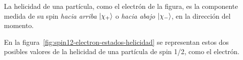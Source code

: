 La helicidad de una partícula, como el electrón de la figura, es la
componente medida de su spin
\emph{hacia arriba} $\ket{\chi_+}$ o \emph{hacia abajo} $\ket{\chi_-}$,
en la dirección del momento.

En la figura~\ref{fig:spin12-electron-estados-helicidad} se representan estos
dos posibles valores de la helicidad de una partícula de spin 1/2, como el
electrón.
\begin{figure}[ht]
  \centering
  \newcommand{\colordirectrizfront}{black}
  \newcommand{\colordirectrizback}{black!50}
  \newcommand{\colormomento}{blue!85!black}
  \newcommand{\colorhelicplus}{green!60!black}
  \newcommand{\colorhelicplustext}{green!45!black}
  \newcommand{\colorhelicminus}{red!80!black}
  \newcommand{\colorhelicminustext}{red!80!black}
  \newcommand{\colorlinaux}{black!15}
  \newcommand{\colorndirector}{black!60}
  \newcommand{\colorelectron}{blue}
  \def\scl{1.2}


\end{figure}
